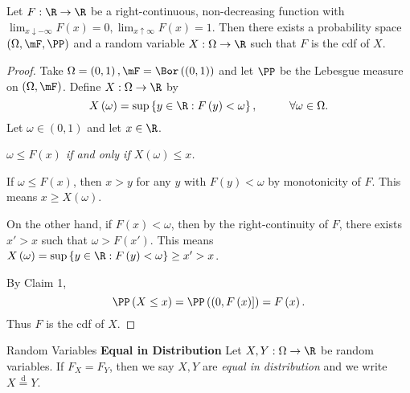 \documentclass[stat901]{subfiles}
\begin{document}
    \begin{theorem}{}
        Let $F:\R\to\R$ be a right-continuous, non-decreasing function with $\lim_{x\downarrow-\infty}F\left( x \right) = 0, \lim_{x\uparrow\infty}F\left( x \right)=1$. Then there exists a probability space $\left( \Omega,\mF,\PP \right)$ and a random variable $X:\Omega\to\R$ such that $F$ is the cdf of $X$.
    \end{theorem}

    \begin{proof}
        Take $\Omega = \left( 0,1 \right), \mF = \Bor\left( \left( 0,1 \right) \right)$ and let $\PP$ be the Lebesgue measure on $\left( \Omega,\mF \right)$. Define $X:\Omega\to\R$ by
        \begin{equation*}
            X\left( \omega \right) = \sup\left\lbrace y\in\R: F\left( y \right) < \omega \right\rbrace,\hspace{1cm}\forall \omega\in\Omega.
        \end{equation*}
        Let $\omega\in\left( 0,1 \right)$ and let $x\in\R$. 

        \begin{claim}
            \textit{$\omega\leq F\left( x \right)$ if and only if $X\left( \omega \right)\leq x$.}

            If $\omega\leq F\left( x \right)$, then $x>y$ for any $y$ with $F\left( y \right)<\omega$ by monotonicity of $F$. This means $x\geq X\left( \omega \right)$.

            On the other hand, if $F\left( x \right)<\omega$, then by the right-continuity of $F$, there exists $x'>x$ such that $\omega>F\left( x' \right)$. This means $X\left( \omega \right) = \sup\left\lbrace y\in\R: F\left( y \right)<\omega \right\rbrace\geq x'>x$.
        \end{claim}

        By Claim 1,
        \begin{equation*}
            \PP\left( X\leq x \right) = \PP\left( \left( 0,F\left( x \right) \right] \right) = F\left( x \right).
        \end{equation*}
        Thus $F$ is the cdf of $X$.
    \end{proof}

    \begin{definition}{Random Variables \textbf{Equal in Distribution}}
        Let $X,Y:\Omega\to\R$ be random variables. If $F_X = F_Y$, then we say $X,Y$ are \emph{equal in distribution} and we write $X \overset{\text{d}}{=} Y$.
    \end{definition}
\end{document}

